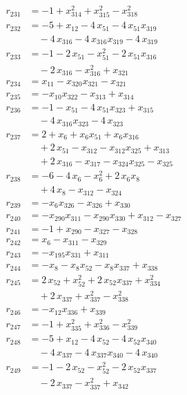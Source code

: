 \begin{align*}
r_{231} &= -1 + x_{314}^{2} + x_{315}^{2} - x_{318}^{2} \\
r_{232} &= -5 + x_{12} - 4\,x_{51} - 4\,x_{51} x_{319} \\
&\quad{}- 4\,x_{316} - 4\,x_{316} x_{319} - 4\,x_{319} \\
r_{233} &= -1 - 2\,x_{51} - x_{51}^{2} - 2\,x_{51} x_{316} \\
&\quad{}- 2\,x_{316} - x_{316}^{2} + x_{321} \\
r_{234} &= x_{11} - x_{320} x_{321} - x_{321} \\
r_{235} &= -x_{10} x_{322} - x_{313} + x_{314} \\
r_{236} &= -1 - x_{51} - 4\,x_{51} x_{323} + x_{315} \\
&\quad{}- 4\,x_{316} x_{323} - 4\,x_{323} \\
r_{237} &= 2 + x_{6} + x_{6} x_{51} + x_{6} x_{316} \\
&\quad{}+ 2\,x_{51} - x_{312} - x_{312} x_{325} + x_{313} \\
&\quad{}+ 2\,x_{316} - x_{317} - x_{324} x_{325} - x_{325} \\
r_{238} &= -6 - 4\,x_{6} - x_{6}^{2} + 2\,x_{6} x_{8} \\
&\quad{}+ 4\,x_{8} - x_{312} - x_{324} \\
r_{239} &= -x_{6} x_{326} - x_{326} + x_{330} \\
r_{240} &= -x_{290} x_{311} - x_{290} x_{330} + x_{312} - x_{327} \\
r_{241} &= -1 + x_{290} - x_{327} - x_{328} \\
r_{242} &= x_{6} - x_{311} - x_{329} \\
r_{243} &= -x_{195} x_{331} + x_{311} \\
r_{244} &= -x_{8} - x_{8} x_{52} - x_{8} x_{337} + x_{338} \\
r_{245} &= 2\,x_{52} + x_{52}^{2} + 2\,x_{52} x_{337} + x_{334}^{2} \\
&\quad{}+ 2\,x_{337} + x_{337}^{2} - x_{338}^{2} \\
r_{246} &= -x_{12} x_{336} + x_{339} \\
r_{247} &= -1 + x_{335}^{2} + x_{336}^{2} - x_{339}^{2} \\
r_{248} &= -5 + x_{12} - 4\,x_{52} - 4\,x_{52} x_{340} \\
&\quad{}- 4\,x_{337} - 4\,x_{337} x_{340} - 4\,x_{340} \\
r_{249} &= -1 - 2\,x_{52} - x_{52}^{2} - 2\,x_{52} x_{337} \\
&\quad{}- 2\,x_{337} - x_{337}^{2} + x_{342} \\

\end{align*}
